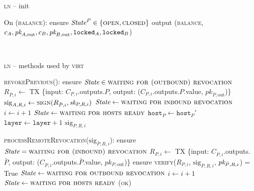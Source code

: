 \begin{center}
\begin{processbox}{\textsc{ln} -- init}
\begin{algorithmic}[1]
      \State On (\textsc{balance}):
      \Indent
        \State ensure $\mathit{State}^P \in \{\textsc{open}, \textsc{closed}\}$
        \label{code:functionality:chan:skeleton:base:balance:start}
        \State output (\textsc{balance}, $c_A, \textit{pk}_{A, \mathrm{out}}, c_B, \textit{pk}_{B,
        \mathrm{out}}, \texttt{locked}_A, \texttt{locked}_B$)
        \label{code:functionality:chan:skeleton:base:balance:end}
      \EndIndent
    \end{algorithmic}
  \end{processbox}
  \label{code:ln:init}
\end{center} \ \\

\begin{center}
  \begin{processbox}{\textsc{ln} -- methods used by \textsc{virt}}
    \begin{algorithmic}[1]
      \State \textsc{revokePrevious}():
      \label{code:ln:methods-for-virt:revoke-previous}
      \Indent
        \State ensure $\itistate \in \textsc{waiting for (outbound)
        revocation}$
        \State $R_{\bar{P}, i} \gets$ TX \{input: $C_{P, i}$.outputs.$P$,
        output: ($C_{P, i}$.outputs.$P$.value, $pk_{\bar{P}, \mathrm{out}}$)\}
        \State $\mathrm{sig}_{A, R, i} \gets \textsc{sign}(R_{\bar{P}, i},
        \textit{sk}_{P, R, i})$
          \State $\itistate \gets \textsc{waiting for inbound revocation}$
        \Else \: 
          \State $i \gets i + 1$
          \State $\itistate \gets \textsc{waiting for hosts ready}$
        \EndIf
        \State $\texttt{host}_P \gets \texttt{host}_P'$ 
        \State $\texttt{layer} \gets \texttt{layer} + 1$
        \label{code:ln:methods-for-virt:host-update}
        \State \Return $\mathrm{sig}_{P, R, i}$
      \EndIndent
      \Statex

      \State \textsc{processRemoteRevocation}($\mathrm{sig}_{\bar{P}, R, i}$):
      \label{code:ln:methods-for-virt:process-remote-revocation}
      \Indent
        \State ensure $\itistate = \textsc{waiting for (inbound)
        revocation}$
        \State $R_{P, i} \gets$ TX \{input: $C_{\bar{P}, i}$.outputs.$\bar{P}$,
        output: ($C_{\bar{P}, i}$.outputs.$\bar{P}$.value, $pk_{P,
        \mathrm{out}}$)\}
        \State ensure \textsc{verify}($R_{P, i}$, $\mathrm{sig}_{\bar{P}, R,
        i}$, $\textit{pk}_{\bar{P}, R, i}$) = True
          \State $\itistate \gets \textsc{waiting for outbound
          revocation}$
        \Else \: 
          \State $i \gets i + 1$
          \State $\itistate \gets \textsc{waiting for hosts ready}$
        \EndIf
        \State \Return (\textsc{ok})
      \EndIndent
      \Statex


\end{algorithmic}
\end{processbox}
\end{center}
